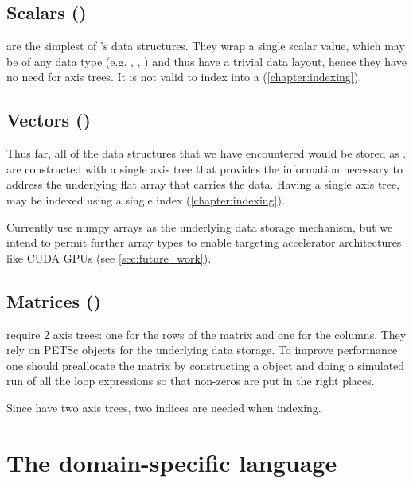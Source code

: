 \documentclass[thesis]{subfiles}
\begin{document}
\subsection{Scalars ()}

 are the simplest of 's data structures.
They wrap a single scalar value, which may be of any data type (e.g. , , ) and thus have a trivial data layout, hence they have no need for axis trees.
It is not valid to index into a  (\cref{chapter:indexing}).

\subsection{Vectors ()}

Thus far, all of the data structures that we have encountered would be stored as .
 are constructed with a single axis tree that provides the information necessary to address the underlying flat array that carries the data.
Having a single axis tree,  may be indexed using a single index (\cref{chapter:indexing}).

Currently  use numpy arrays as the underlying data storage mechanism, but we intend to permit further array types to enable targeting accelerator architectures like CUDA GPUs (see \cref{sec:future_work}).

\subsection{Matrices ()}

 require 2 axis trees: one for the rows of the matrix and one for the columns.
They rely on PETSc  objects for the underlying data storage.
To improve performance one should preallocate the matrix by constructing a  object and doing a simulated run of all the loop expressions so that non-zeros are put in the right places.

Since  have two axis trees, two indices are needed when indexing.

\section{The domain-specific language}
\label{sec:dsl}
\end{document}
